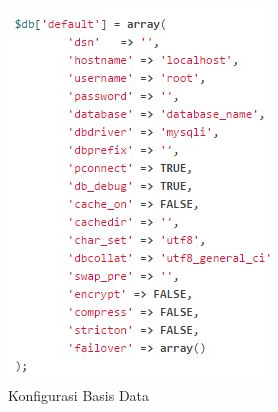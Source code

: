 	\begin{figure}[H]
		\centering
		\includegraphics[scale=1]{Gambar/database}
		\caption{Konfigurasi Basis Data}
		\label{fig:database}
	\end{figure}
	
